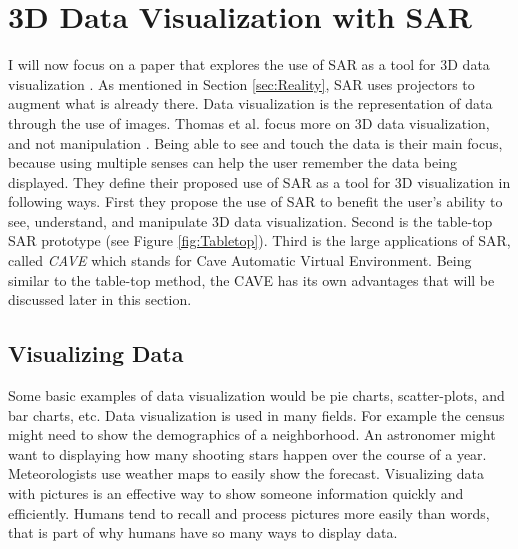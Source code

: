 \documentclass{sig-alternate}
\begin{document}
\section{3D Data Visualization with SAR}
\label{sec:3D Data Visualization}
I will now focus on a paper that explores the use of SAR as a tool for 3D data visualization \cite{3D}. As mentioned in Section \ref{sec:Reality}, SAR uses projectors to augment what is already there. Data visualization is the representation of data through the use of images. Thomas et al. focus more on 3D data visualization, and not manipulation \cite{3D}. Being able to see and touch the data is their main focus, because using multiple senses can help the user remember the data being displayed. They define their proposed use of SAR as a tool for 3D visualization in following ways. First they propose the use of SAR to benefit the user's ability to see, understand, and manipulate 3D data visualization. Second is the table-top SAR prototype (see Figure \ref{fig:Tabletop}). Third is the large applications of SAR, called \textit{CAVE} which  stands for Cave Automatic Virtual Environment. Being similar to the table-top method, the CAVE has its own advantages that will be discussed later in this section. 

\subsection{Visualizing Data}
\label{sec:Visualizing Data}
Some basic examples of data visualization would be pie charts, scatter-plots, and bar charts, etc. Data visualization is used in many fields. For example the census might need to show the demographics of a neighborhood. An astronomer might want to displaying how many shooting stars happen over the course of a year. Meteorologists use weather maps to easily show the forecast. Visualizing data with pictures is an effective way to show someone information quickly and efficiently. Humans tend to recall and process pictures more easily than words, that is part of why humans have so many ways to display data.   
\end{document}

